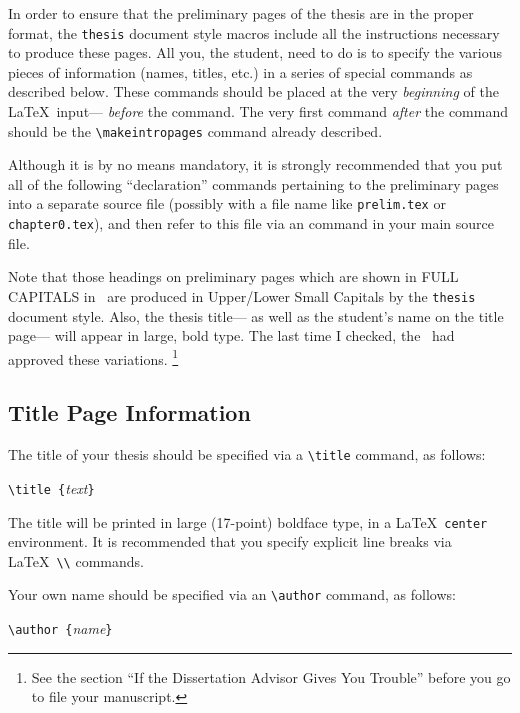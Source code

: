 In order to ensure that the preliminary pages
of the thesis are in the proper format,
the \verb+thesis+ document style macros
include all the instructions necessary
to produce these pages.
All you, the student, need to do
is to specify the various pieces of information
(names, titles, etc.)
in a series of special commands as described below.
These commands should be placed at the very {\em beginning\/}
of the \LaTeX\ input---%
{\em before\/} the \verb++ command.
The very first command
{\em after\/} the \verb++ command
should be the \verb+\makeintropages+ command already described.

Although it is by no means mandatory,
it is strongly recommended
that you put all of the following ``declaration'' commands
pertaining to the preliminary pages
into a separate source file
(possibly with a file name like \verb+prelim.tex+
or \verb+chapter0.tex+),
and then refer to this file via an \verb++ command
in your main source file.

Note that those headings on preliminary pages
which are shown in FULL CAPITALS in \regs\
are produced in {\sc Upper/Lower Small Capitals}
by the \verb+thesis+ document style.
Also, the thesis title---%
as well as the student's name on the title page---%
will appear in large, bold type.
The last time I checked,
the \tdadvisor\ had approved these variations.%
\footnote {See the section
``If the Dissertation Advisor Gives You Trouble''
before you go to file your manuscript.}

\subsection {Title Page Information}

The title of your thesis should be specified
via a \verb+\title+ command, as follows:

\begin {center}
\verb+\title {+{\sl text\/}\verb+}+
\end {center}

The title will be printed in large (17-point) boldface type,
in a \LaTeX\ \verb+center+ environment.
It is recommended that you specify explicit line breaks
via \LaTeX\ \verb+\\+ commands.

Your own name should be specified
via an \verb+\author+ command, as follows:

\begin {center}
\verb+\author {+{\sl name\/}\verb+}+
\end {center}

